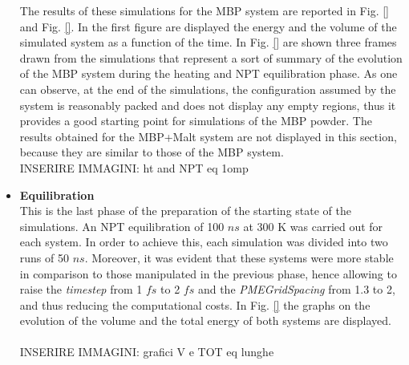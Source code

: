 \begin{itemize}
The results of these simulations for the MBP system are reported in Fig. \ref{} and Fig. \ref{}. In the first figure are displayed the energy and the volume of the simulated system as a function of the time. In Fig. \ref{} are shown three frames drawn from the simulations that represent a sort of summary of the evolution of the MBP system during the heating and NPT equilibration phase. As one can observe, at the end of the simulations, the configuration assumed by the system is reasonably packed and does not display any empty regions, thus it provides a good starting point for simulations of the MBP powder. The results obtained for the MBP+Malt system are not displayed in this section, because they are similar to those of the MBP system. 
\\
INSERIRE IMMAGINI: ht and NPT eq 1omp\\

\item \textbf{Equilibration}\\
This is the last phase of the preparation of the starting state of the simulations. An NPT equilibration of 100 $ns$ at 300 K was carried out for each system. In order to achieve this, each simulation was divided into two runs of 50 $ns$. Moreover, it was evident that these systems were more stable in comparison to those manipulated in the previous phase, hence allowing to raise the \textit{timestep} from 1 $fs$ to 2 $fs$ and the \textit{PMEGridSpacing} from 1.3 to 2, and thus reducing the computational costs. In Fig. \ref{} the graphs on the evolution of the volume and the total energy of both systems are displayed. \\
\\
INSERIRE IMMAGINI: grafici V e TOT eq lunghe\\
\end{itemize} 

